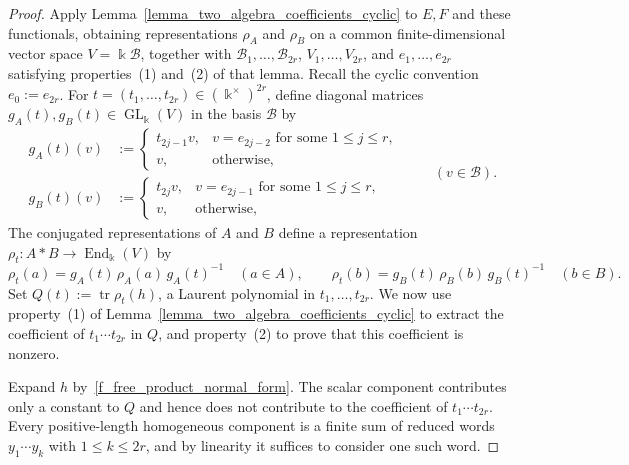 \begin{proof}
    Apply Lemma~\ref{lemma_two_algebra_coefficients_cyclic} to \(E,F\) and these functionals, obtaining representations \(\rho_A\) and \(\rho_B\) on a common finite-dimensional vector space \(V=\Bbbk\mathcal{B}\), together with \(\mathcal{B}_1,\ldots,\mathcal{B}_{2r}\), \(V_1,\ldots,V_{2r}\), and \(e_1,\ldots,e_{2r}\) satisfying properties~(1) and~(2) of that lemma.
    Recall the cyclic convention \(e_0:=e_{2r}\).
    For \(t=(t_1,\ldots,t_{2r})\in(\Bbbk^\times)^{2r}\), define diagonal matrices \(g_A(t),g_B(t)\in\operatorname{GL}_{\Bbbk}(V)\) in the basis \(\mathcal{B}\) by
    \[
        \begin{aligned}
            g_A(t)(v)&:=
            \begin{cases}
                t_{2j-1}v,& v=e_{2j-2}\text{ for some }1\leq j\leq r,\\
                v,& \text{otherwise},
            \end{cases}\\
            g_B(t)(v)&:=
            \begin{cases}
                t_{2j}v,& v=e_{2j-1}\text{ for some }1\leq j\leq r,\\
                v,& \text{otherwise},
            \end{cases}
        \end{aligned}
        \qquad(v\in\mathcal{B}).
    \]
    The conjugated representations of \(A\) and \(B\) define a representation \(\rho_t\colon A*B\to\operatorname{End}_{\Bbbk}(V)\) by
    \[
        \rho_t(a)=g_A(t)\,\rho_A(a)\,g_A(t)^{-1}\quad(a\in A),\qquad \rho_t(b)=g_B(t)\,\rho_B(b)\,g_B(t)^{-1}\quad(b\in B).
    \]
    Set \(Q(t):=\operatorname{tr}\rho_t(h)\), a Laurent polynomial in \(t_1,\ldots,t_{2r}\).
    We now use property~(1) of Lemma~\ref{lemma_two_algebra_coefficients_cyclic} to extract the coefficient of \(t_1\cdots t_{2r}\) in \(Q\), and property~(2) to prove that this coefficient is nonzero.

    Expand \(h\) by~\eqref{f_free_product_normal_form}.
    The scalar component contributes only a constant to \(Q\) and hence does not contribute to the coefficient of \(t_1\cdots t_{2r}\).
    Every positive-length homogeneous component is a finite sum of reduced words \(y_1\cdots y_k\) with \(1\leq k\leq2r\), and by linearity it suffices to consider one such word.


\end{proof}
